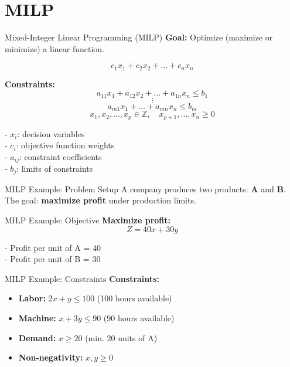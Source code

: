 \documentclass{beamer}
\begin{document}
\section{MILP}

\begin{frame}{Mixed-Integer Linear Programming (MILP)}
\textbf{Goal:} Optimize (maximize or minimize) a linear function.

\[
 c_1x_1 + c_2x_2 + \dots + c_nx_n
\]

\textbf{Constraints:}
\[
a_{11}x_1 + a_{12}x_2 + \dots + a_{1n}x_n \leq b_1
\]
\[
\vdots
\]
\[
a_{m1}x_1 + \dots + a_{mn}x_n \leq b_m
\]
\[
x_1, x_2, \dots, x_p \in \mathbb{Z}, 
\quad x_{p+1}, \dots, x_n \geq 0
\]

\bigskip
\small
- $x_i$: decision variables \\
- $c_i$: objective function weights \\
- $a_{ij}$: constraint coefficients \\
- $b_j$: limits of constraints
\end{frame}



\begin{frame}{MILP Example: Problem Setup}
A company produces two products: \textbf{A} and \textbf{B}.  
The goal: \textbf{maximize profit} under production limits.


\end{frame}

\begin{frame}{MILP Example: Objective}
\textbf{Maximize profit:}
\[
Z = 40x + 30y
\]

\smallskip
- Profit per unit of A = 40 \\
- Profit per unit of B = 30
\end{frame}

\begin{frame}{MILP Example: Constraints}
\textbf{Constraints:}
\begin{itemize}
    \item \textbf{Labor: } $2x + y \leq 100$ \hfill (100 hours available)
    \item \textbf{Machine: } $x + 3y \leq 90$ \hfill (90 hours available)
    \item \textbf{Demand: } $x \geq 20$ \hfill (min. 20 units of A)
    \item \textbf{Non-negativity: } $x, y \geq 0$
\end{itemize}
\end{frame}
\end{document}
